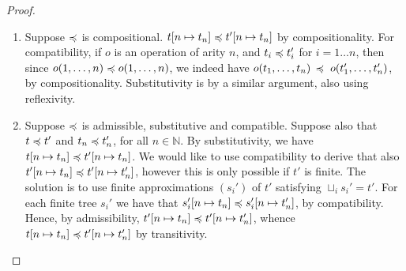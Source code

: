 \begin{proof}
    \begin{enumerate}
        \item 
             Suppose $\preccurlyeq$ is compositional. 
            $t[ n \mapsto t_n] \preccurlyeq t'[n \mapsto t_n]$ by compositionality.
            For compatibility, if $o$ is an operation of arity $n$, and $t_i \preccurlyeq t'_i$ for $i = 1 \dots n$, then since $o(1,\dots, n) \preccurlyeq o(1,\dots, n)$,
             we indeed have $o(t_1, \dots, t_n) \, \preccurlyeq \; o(t'_1, \dots, t'_n)$, by compositionality.
             Substitutivity is by a similar argument, also using reflexivity.

        \item 
            Suppose $\preccurlyeq$ is admissible, substitutive and compatible. 
            Suppose also that $t \preccurlyeq t'$ and $t_n \preccurlyeq t_n'$, for all $n \in \mathbb{N}$.
            By substitutivity, we have $t[n \mapsto t_n] \preccurlyeq t'[n \mapsto t_n]$.
             We would like to use compatibility to derive 
            that also $t'[n \mapsto t_n] \preccurlyeq t'[n \mapsto
            t_n']$, however this is only possible if $t'$ is finite. 
            The solution is to use finite approximations $(s_i')$ of $t'$
            satisfying $\sqcup_i s_i' = t'$. For each finite tree $s_i'$
            we have that $s_i'[n \mapsto t_n] \preccurlyeq s_i'[n \mapsto t_n']$, by compatibility.
            Hence, by admissibility, $t'[n \mapsto t_n] \preccurlyeq t'[n \mapsto
            t_n']$, whence $t[n \mapsto t_n] \preccurlyeq t'[n \mapsto t_n']$ by transitivity.
        \end{enumerate}
\end{proof}


